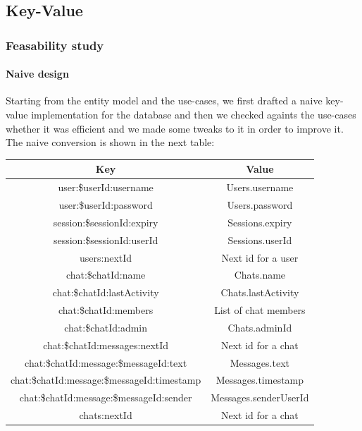 \documentclass[10pt]{article}
\begin{document}
\subsection{Key-Value}
\subsubsection{Feasability study}
\paragraph{Naive design}
Starting from the entity model and the use-cases, we first drafted a naive key-value 
implementation for the database and then we checked againts the use-cases whether 
it was efficient and we made some tweaks to it in order to improve it. The naive
conversion is shown in the next table:

\begin{center}
\begin{tabular}{ | c | c | }
    \hline
    \textbf{Key} & \textbf{Value} \\\hline
    user:\$userId:username & Users.username \\\hline
    user:\$userId:password & Users.password \\\hline
    session:\$sessionId:expiry & Sessions.expiry \\\hline
    session:\$sessionId:userId & Sessions.userId \\\hline
    users:nextId & Next id for a user \\\hline
    chat:\$chatId:name & Chats.name \\\hline
    chat:\$chatId:lastActivity & Chats.lastActivity \\\hline
    chat:\$chatId:members & List of chat members \\\hline
    chat:\$chatId:admin & Chats.adminId\\\hline
    chat:\$chatId:messages:nextId & Next id for a chat \\\hline
    chat:\$chatId:message:\$messageId:text & Messages.text \\\hline
    chat:\$chatId:message:\$messageId:timestamp & Messages.timestamp \\\hline
    chat:\$chatId:message:\$messageId:sender & Messages.senderUserId \\\hline
    chats:nextId & Next id for a chat \\\hline
\end{tabular}
\end{center}
\end{document}
